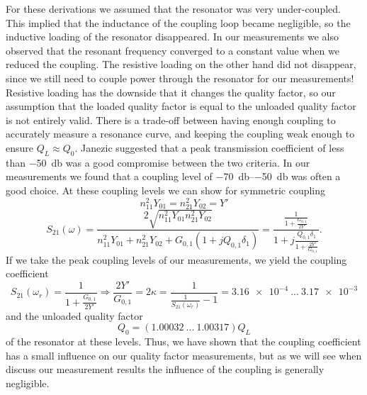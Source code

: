 For these derivations we assumed that the resonator was very under-coupled. This implied that the inductance of the coupling loop became negligible, so the inductive loading of the resonator disappeared. In our measurements we also observed that the resonant frequency converged to a constant value when we reduced the coupling. The resistive loading on the other hand did not disappear, since we still need to couple power through the resonator for our measurements! Resistive loading has the downside that it changes the quality factor, so our assumption that the loaded quality factor is equal to the unloaded quality factor is not entirely valid. There is a trade-off between having enough coupling to accurately measure a resonance curve, and keeping the coupling weak enough to ensure $Q_L\approx Q_0$. Janezic \cite{janezic} suggested that a peak transmission coefficient of less than \SI{-50}{\decibel} was a good compromise between the two criteria. In our measurements we found that a coupling level of \SIrange{-70}{-50}{\decibel} was often a good choice. At these coupling levels we can show for symmetric coupling
\begin{equation}
n_{11}^2Y_{01}=n_{21}^2Y_{02}=Y'
\end{equation}
\begin{equation}
S_{21}(\omega)=\frac{2\sqrt{n_{11}^2Y_{01}n_{21}^2Y_{02}}}{n_{11}^2Y_{01}+n_{21}^2Y_{02}+G_{0,1}(1+jQ_{0,1}\delta_1)}=\frac{\frac{1}{1+\frac{G_{0,1}}{2Y'}}}{1+j\frac{Q_{0,1}\delta_1}{1+\frac{2Y'}{G_{0,1}}}}\text{.}
\end{equation}
If we take the peak coupling levels of our measurements, we yield the coupling coefficient
\begin{equation}
S_{21}(\omega_r)=\frac{1}{1+\frac{G_{0,1}}{2Y'}} \Rightarrow \frac{2Y'}{G_{0,1}}=2\kappa=\frac{1}{\frac{1}{S_{21}(\omega_r)}-1}=\num{3.16e-4}\ ...\ \num{3.17e-3}
\end{equation} 
and the unloaded quality factor 
\begin{equation}
Q_0=(\num{1.00032}\ ...\ \num{1.00317})Q_L
\end{equation} of the resonator at these levels. Thus, we have shown that the coupling coefficient has a small influence on our quality factor measurements, but as we will see when discuss our measurement results the influence of the coupling is generally negligible. 
